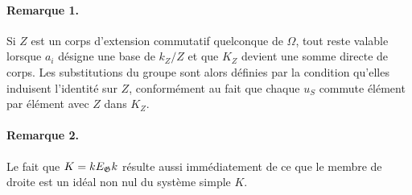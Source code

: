\paragraph{Remarque 1.}
Si \(Z\) est un corps d'extension commutatif quelconque de \(\Omega\), tout reste valable lorsque \(a_i\) désigne une base de \(k_Z/Z\) et que \(K_Z\) devient une somme directe de corps. Les substitutions du groupe sont alors définies par la condition qu'elles induisent l'identité sur \(Z\), conformément au fait que chaque \(u_S\) commute élément par élément avec \(Z\) dans \(K_Z\).

\paragraph{Remarque 2.}
Le fait que \(K=kE_\mathfrak G k\) résulte aussi immédiatement de ce que le membre de droite est un idéal non nul du système simple \(K\).

